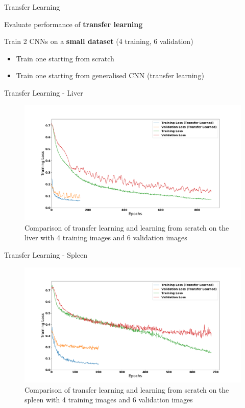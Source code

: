\documentclass[10pt]{beamer}
\begin{document}
%
%

\begin{frame}[fragile]{Transfer Learning}

  Evaluate performance of \textbf{transfer learning}

  Train 2 CNNs on a \textbf{small dataset} (4 training, 6 validation)
  \begin{itemize}
  \item Train one starting from scratch
  \item Train one starting from generalised CNN (transfer learning)
  \end{itemize}

\end{frame}

\begin{frame}[fragile]{Transfer Learning - Liver}
  
 \begin{figure}[h!]
    \centering
    \includegraphics[scale=0.21]{pictures/transferLiver}
    \caption{Comparison of transfer learning and learning from scratch on the liver with 4 training images and 6 validation images}
    \label{fig:liverPlot}
  \end{figure}
  
\end{frame}

\begin{frame}[fragile]{Transfer Learning - Spleen}
  
 \begin{figure}[h!]
    \centering
    \includegraphics[scale=0.22]{pictures/transferSpleen}
    \caption{Comparison of transfer learning and learning from scratch on the spleen with 4 training images and 6 validation images}
    \label{fig:spleenPlot}
  \end{figure}
  
\end{frame}
\end{document}
